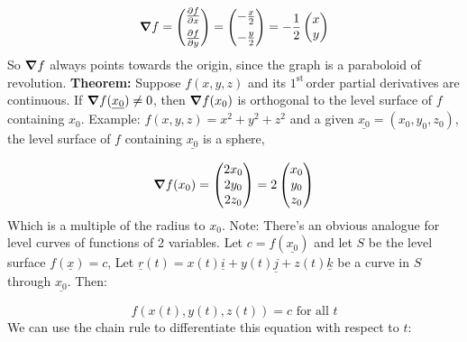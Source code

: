 \documentclass{article}
\newcommand{\n}{\leavevmode \newline} %
\newcommand{\nn}{\leavevmode \newline \newline} %
\newcommand{\first}{$1^{\text{st}}\,$} %
\numberwithin{equation}{subsection} %
\begin{document}
\begin{equation}
    \grad f = 
    \begin{pmatrix}
    \pdv{f}{x} \vspace{0.5em}\\ \pdv{f}{y}
    \end{pmatrix}
    =
    \begin{pmatrix}
    -\frac{x}{2} \vspace{0.5em} \\ -\frac{y}{2}
    \end{pmatrix}
    = -\frac{1}{2}
    \begin{pmatrix}
    x \\ y
    \end{pmatrix}
\end{equation}
\n
So $\grad f$ always points towards the origin, since the graph is a paraboloid of revolution.
\nn
\textbf{Theorem: } Suppose $f(x,y,z)$ and its \first order partial derivatives are continuous. If $\grad f(\underline{x_0})\neq 0$, then $\grad f(x_0)$ is orthogonal to the level surface of $f$ containing $x_0$.
\nn
Example: $f(x,y,z)=x^2+y^2+z^2$ and a given $\underline{x_0}=(x_0,y_0,z_0)$, the level surface of $f$ containing $\underline{x_0}$ is a sphere,

\begin{equation}
    \grad f(x_0)=
    \begin{pmatrix}
    2x_0 \\ 2y_0 \\ 2z_0
    \end{pmatrix}
    = 2
    \begin{pmatrix}
    x_0 \\ y_0 \\ z_0
    \end{pmatrix}
\end{equation}
\n
Which is a multiple of the radius to $x_0$.
\nn
Note: There's an obvious analogue for level curves of functions of 2 variables. Let $c=f(\underline{x_0})$ and let $S$ be the level surface ${f(\underline{x})=c}$, Let $\underline{r}(t)= x(t)\underline{i} + y(t)\underline{j} + z(t)\underline{k}$ be a curve in $S$ through $\underline{x_0}$. Then:

\begin{equation}
    f(x(t),y(t),z(t))=c \text{ for all } t
\end{equation}
\n
We can use the chain rule to differentiate this equation with respect to $t$:
\end{document}
